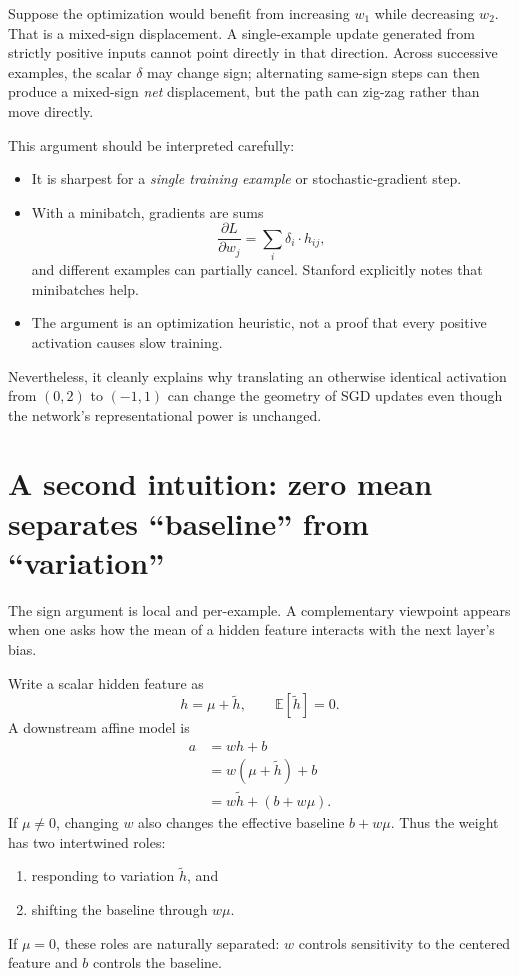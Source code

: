 \documentclass[11pt]{article}
\newcommand{\E}{\mathbb{E}}
\begin{document}
Suppose the optimization would benefit from increasing \(w_1\) while decreasing \(w_2\).  That is a mixed-sign displacement.  A single-example update generated from strictly positive inputs cannot point directly in that direction.  Across successive examples, the scalar \(\delta\) may change sign; alternating same-sign steps can then produce a mixed-sign \emph{net} displacement, but the path can zig-zag rather than move directly.

This argument should be interpreted carefully:
\begin{itemize}
  \item It is sharpest for a \emph{single training example} or stochastic-gradient step.
  \item With a minibatch, gradients are sums
  \[
    \frac{\partial L}{\partial w_j}=\sum_i \delta_i\cdot h_{ij},
  \]
  and different examples can partially cancel.  Stanford explicitly notes that minibatches help.
  \item The argument is an optimization heuristic, not a proof that every positive activation causes slow training.
\end{itemize}

Nevertheless, it cleanly explains why translating an otherwise identical activation from \((0,2)\) to \((-1,1)\) can change the geometry of SGD updates even though the network's representational power is unchanged.

\section{A second intuition: zero mean separates ``baseline'' from ``variation''}

The sign argument is local and per-example.  A complementary viewpoint appears when one asks how the mean of a hidden feature interacts with the next layer's bias.

Write a scalar hidden feature as
\begin{equation}
  h=\mu+\tilde h,
  \qquad
  \E[\tilde h]=0.
\end{equation}
A downstream affine model is
\begin{align}
  a&=wh+b\\
   &=w(\mu+\tilde h)+b\\
   &=w\tilde h+(b+w\mu).
  \label{eq:effectivebias}
\end{align}
If \(\mu\neq0\), changing \(w\) also changes the effective baseline \(b+w\mu\).  Thus the weight has two intertwined roles:
\begin{enumerate}
  \item responding to variation \(\tilde h\), and
  \item shifting the baseline through \(w\mu\).
\end{enumerate}
If \(\mu=0\), these roles are naturally separated: \(w\) controls sensitivity to the centered feature and \(b\) controls the baseline.
\end{document}
